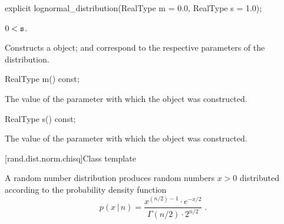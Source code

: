 %
\begin{itemdecl}
explicit lognormal_distribution(RealType m = 0.0, RealType s = 1.0);
\end{itemdecl}

\begin{itemdescr}
\pnum\requires
 $ 0 < \texttt{s} $.

\pnum\effects Constructs a  object;
  and 
 correspond to the respective parameters of the distribution.
\end{itemdescr}

%
\begin{itemdecl}
RealType m() const;
\end{itemdecl}

\begin{itemdescr}
\pnum\returns The value of the  parameter
 with which the object was constructed.
\end{itemdescr}

%
\begin{itemdecl}
RealType s() const;
\end{itemdecl}

\begin{itemdescr}
\pnum\returns The value of the  parameter
 with which the object was constructed.
\end{itemdescr}


[rand.dist.norm.chisq]{Class template }%
%
%

\pnum
A  random number distribution
produces random numbers $x>0$
distributed according to
the probability density function%
%
%
\[%
 p(x\,|\,n)
      =  \frac{ x^{(n/2)-1} \cdot e^{-x/2}}
              {\Gamma(n/2) \cdot 2^{n/2}}
\; \mbox{.}
\]


